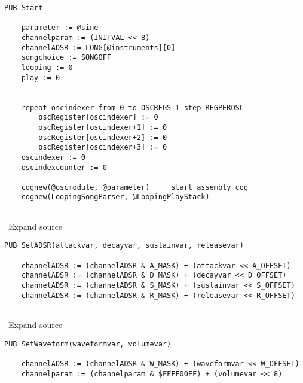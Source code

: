\lstset{style=spin}
\begin{lstlisting}
PUB Start
      
    parameter := @sine
    channelparam := (INITVAL << 8)
    channelADSR := LONG[@instruments][0]
    songchoice := SONGOFF
    looping := 0  
    play := 0
    
    
    repeat oscindexer from 0 to OSCREGS-1 step REGPEROSC
        oscRegister[oscindexer] := 0
        oscRegister[oscindexer+1] := 0
        oscRegister[oscindexer+2] := 0
        oscRegister[oscindexer+3] := 0
    oscindexer := 0
    oscindexcounter := 0
    
    cognew(@oscmodule, @parameter)    'start assembly cog
    cognew(LoopingSongParser, @LoopingPlayStack)
    
\end{lstlisting}


\textbf{} ~Expand source

\lstset{style=spin}
\begin{lstlisting}
PUB SetADSR(attackvar, decayvar, sustainvar, releasevar)

    channelADSR := (channelADSR & A_MASK) + (attackvar << A_OFFSET)
    channelADSR := (channelADSR & D_MASK) + (decayvar << D_OFFSET)
    channelADSR := (channelADSR & S_MASK) + (sustainvar << S_OFFSET)
    channelADSR := (channelADSR & R_MASK) + (releasevar << R_OFFSET)
  
\end{lstlisting}


\textbf{} ~Expand source

\lstset{style=spin}
\begin{lstlisting}
PUB SetWaveform(waveformvar, volumevar)

    channelADSR := (channelADSR & W_MASK) + (waveformvar << W_OFFSET)
    channelparam := (channelparam & $FFFF00FF) + (volumevar << 8)
\end{lstlisting}

